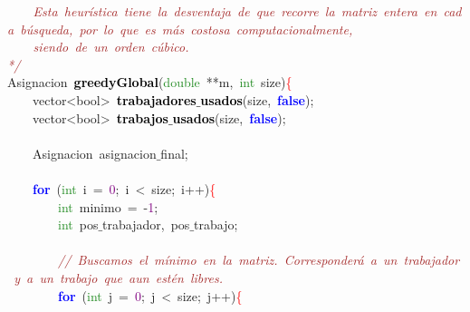 \mbox{}\textit{\textcolor{Brown}{\ \ \ \ Esta\ heurística\ tiene\ la\ desventaja\ de\ que\ recorre\ la\ matriz\ entera\ en\ cada\ búsqueda,\ por\ lo\ que\ es\ más\ costosa\ computacionalmente,\ }} \\
\mbox{}\textit{\textcolor{Brown}{\ \ \ \ siendo\ de\ un\ orden\ cúbico.\ }} \\
\mbox{}\textit{\textcolor{Brown}{*/}}\  \\
\mbox{}\textcolor{TealBlue}{Asignacion}\ \textbf{\textcolor{Black}{greedyGlobal}}\textcolor{BrickRed}{(}\textcolor{ForestGreen}{double}\ \textcolor{BrickRed}{**}m\textcolor{BrickRed}{,}\ \textcolor{ForestGreen}{int}\ size\textcolor{BrickRed}{)}\textcolor{Red}{\{} \\
\mbox{}\ \ \ \ \textcolor{TealBlue}{vector\textless{}bool\textgreater{}}\ \textbf{\textcolor{Black}{trabajadores$\_$usados}}\textcolor{BrickRed}{(}size\textcolor{BrickRed}{,}\ \textbf{\textcolor{Blue}{false}}\textcolor{BrickRed}{);} \\
\mbox{}\ \ \ \ \textcolor{TealBlue}{vector\textless{}bool\textgreater{}}\ \textbf{\textcolor{Black}{trabajos$\_$usados}}\textcolor{BrickRed}{(}size\textcolor{BrickRed}{,}\ \textbf{\textcolor{Blue}{false}}\textcolor{BrickRed}{);} \\
\mbox{} \\
\mbox{}\ \ \ \ \textcolor{TealBlue}{Asignacion}\ asignacion$\_$final\textcolor{BrickRed}{;}\  \\
\mbox{} \\
\mbox{}\ \ \ \ \textbf{\textcolor{Blue}{for}}\ \textcolor{BrickRed}{(}\textcolor{ForestGreen}{int}\ i\ \textcolor{BrickRed}{=}\ \textcolor{Purple}{0}\textcolor{BrickRed}{;}\ i\ \textcolor{BrickRed}{\textless{}}\ size\textcolor{BrickRed}{;}\ i\textcolor{BrickRed}{++)}\textcolor{Red}{\{}\ \ \ \ \ \ \ \  \\
\mbox{}\ \ \ \ \ \ \ \ \textcolor{ForestGreen}{int}\ minimo\ \textcolor{BrickRed}{=}\ \textcolor{BrickRed}{-}\textcolor{Purple}{1}\textcolor{BrickRed}{;} \\
\mbox{}\ \ \ \ \ \ \ \ \textcolor{ForestGreen}{int}\ pos$\_$trabajador\textcolor{BrickRed}{,}\ pos$\_$trabajo\textcolor{BrickRed}{;}\  \\
\mbox{} \\
\mbox{}\ \ \ \ \ \ \ \ \textit{\textcolor{Brown}{//\ Buscamos\ el\ mínimo\ en\ la\ matriz.\ Corresponderá\ a\ un\ trabajador\ y\ a\ un\ trabajo\ que\ aun\ estén\ libres.\ }} \\
\mbox{}\ \ \ \ \ \ \ \ \textbf{\textcolor{Blue}{for}}\ \textcolor{BrickRed}{(}\textcolor{ForestGreen}{int}\ j\ \textcolor{BrickRed}{=}\ \textcolor{Purple}{0}\textcolor{BrickRed}{;}\ j\ \textcolor{BrickRed}{\textless{}}\ size\textcolor{BrickRed}{;}\ j\textcolor{BrickRed}{++)}\textcolor{Red}{\{} \\

